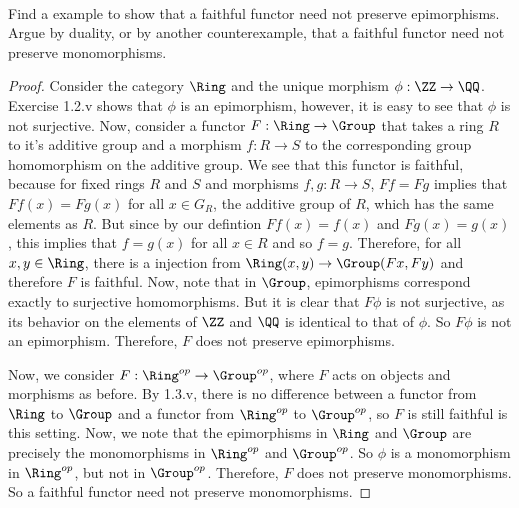 \documentclass[main.tex]{subfiles}
\begin{document}
\paragraph{}
\begin{exercise}
	Find a example to show that a faithful functor need not preserve
	epimorphisms. Argue by duality, or by another counterexample, that a
	faithful functor need not preserve monomorphisms.
\end{exercise}
\begin{proof}
	Consider the category $\Ring$ and the unique morphism $\phi: \ZZ \rightarrow
	\QQ$. Exercise 1.2.v shows that $\phi$ is an epimorphism, however, it is
	easy to see that $\phi$ is not surjective. Now, consider a functor $F: \Ring
	\rightarrow \Group$ that takes a ring $R$ to it's additive group and a
	morphism $f: R \rightarrow S$ to the corresponding group homomorphism on the
	additive group. We see that this functor is faithful, because for fixed
	rings $R$ and $S$ and morphisms $f,g : R \rightarrow S$, $Ff = Fg$ implies
	that $Ff(x) = Fg(x)$ for all $x \in G_R$, the additive group of $R$, which
	has the same elements as $R$. But since by our defintion $Ff(x) = f(x)$ and
	$Fg(x) = g(x)$, this implies that $f = g(x)$ for all $x \in R$ and so $f =
	g$. Therefore, for all $x,y \in \Ring$, there is a injection from
	$\Ring(x,y) \rightarrow \Group (Fx,Fy)$ and therefore $F$ is faithful.  Now,
	note that in $\Group$, epimorphisms correspond exactly to surjective
	homomorphisms. But it is clear that $F\phi$ is not surjective, as its
	behavior on the elements of $\ZZ$ and $\QQ$ is identical to that of $\phi$.
	So $F\phi$ is not an epimorphism. Therefore, $F$ does not preserve
	epimorphisms.

	Now, we consider $F: \Ring^{op} \rightarrow \Group^{op}$, where $F$ acts on
	objects and morphisms as before. By 1.3.v, there is no difference between a
	functor from $\Ring$ to $\Group$ and a functor from $\Ring^{op}$ to
	$\Group^{op}$, so $F$ is still faithful is this setting. Now, we note that
	the epimorphisms in $\Ring$ and $\Group$ are precisely the monomorphisms in
	$\Ring^{op}$ and $\Group^{op}$. So $\phi$ is a monomorphism in $\Ring^{op}$,
	but not in $\Group^{op}$. Therefore, $F$ does not preserve monomorphisms. So
	a faithful functor need not preserve monomorphisms.
\end{proof}
\end{document}
